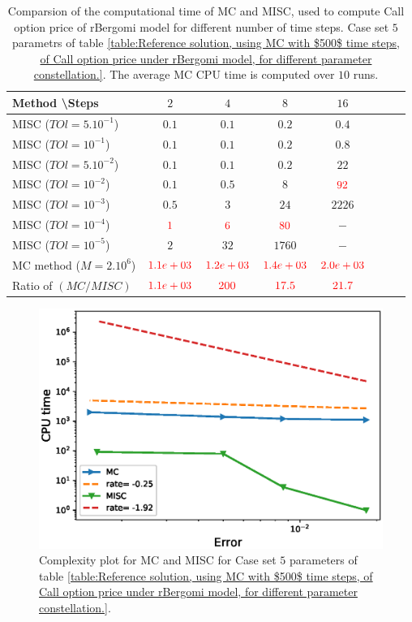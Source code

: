 \documentclass[11pt]{article}
\begin{document}
\begin{table}[h!]
	\centering
	\begin{tabular}{l*{6}{c}r}
		Method \textbackslash  Steps            & $2$ & $4$ & $8$ & $16$ &   \\
		\hline
		MISC ($TOl=5.10^{-1}$)  & $0.1$ & $0.1$ & $0.2$ & $0.4$  \\
		MISC ($TOl=10^{-1}$)  & $0.1$ & $0.1$ & $0.2$ & $0.8$ \\
		MISC ($TOl=5.10^{-2}$)  & $0.1$ & $0.1$ & $0.2$ & $22$  \\
		MISC ($TOl=10^{-2}$)  & $0.1$ & $0.5$ & $8$ & $\red{92}$ \\
		MISC ($TOl=10^{-3}$)  & $0.5$ & $3$ & $24$ & $2226$ \\
		MISC ($TOl=10^{-4}$)  & $\red{1}$ & $\red{6}$ & $\red{80}$ & $-$\\
		MISC ($TOl=10^{-5}$)  & $2$ & $32$ & $1760$ & $-$
		 \\
		\hline
		MC method ($M=2.10^6$)   & $ \red{1.1e+03}
		
		$  & $  \red{1.2e+03}$  & $  \red{1.4e+03}$ & $ \red{2.0e+03}
		$  \\	
		\hline
		Ratio of $\left(MC/MISC \right)$ & $ \red{1.1e+03}
		
		$  & $  \red{200}$  & $  \red{  17.5
		}$ & $ \red{ 21.7}
		$  \\	
		
		\hline
	\end{tabular}
	\caption{Comparsion of the computational time of  MC and MISC, used to compute Call option price of rBergomi model for different number of time steps. Case set $5$ parametrs of table \ref{table:Reference solution, using MC with $500$ time steps, of Call option price under rBergomi model, for different parameter constellation.}. The average  MC CPU time is computed over $10$ runs. }
	\label{Comparsion of the computational time of  MC and MISC, used to compute Call option price of rBergomi model for different number of time steps. Case set5}
\end{table}

	\begin{figure}[h!]
	\centering
	\includegraphics[width=0.7\linewidth]{./figures/rBergomi_Complexity_rates/set5/error_vs_time_set5}

	\caption{Complexity plot for   MC and MISC for Case set $5$ parameters of table \ref{table:Reference solution, using MC with $500$ time steps, of Call option price under rBergomi model, for different parameter constellation.}.}
	\label{fig:Complexity plot for MC and MISC for Case set $5$ parameters}
\end{figure}
\end{document}
